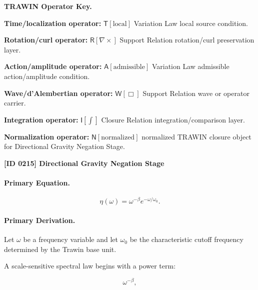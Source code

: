 \par\vspace{0.45\baselineskip}
\noindent\begin{minipage}[t]{\linewidth}
\begingroup
\small
\raggedright
\textbf{TRAWIN Operator Key.}\par
\noindent\textbf{Time/localization operator:} $\mathsf{T}\!\left[\mathrm{local}\right]$ Variation Law local source condition.\par
\noindent\textbf{Rotation/curl operator:} $\mathsf{R}\!\left[\nabla\times\right]$ Support Relation rotation/curl preservation layer.\par
\noindent\textbf{Action/amplitude operator:} $\mathsf{A}\!\left[\mathrm{admissible}\right]$ Variation Law admissible action/amplitude condition.\par
\noindent\textbf{Wave/d'Alembertian operator:} $\mathsf{W}\!\left[\Box\right]$ Support Relation wave or operator carrier.\par
\noindent\textbf{Integration operator:} $\mathsf{I}\!\left[\int\right]$ Closure Relation integration/comparison layer.\par
\noindent\textbf{Normalization operator:} $\mathsf{N}\!\left[\mathrm{normalized}\right]$ normalized TRAWIN closure object for Directional Gravity Negation Stage.\par
\endgroup
\end{minipage}

\clearpage
\noindent\textbf{[ID 0215] Directional Gravity Negation Stage}\par
\vspace{0.35em}
\paragraph{Primary Equation.}
\begin{equation}
\eta(\omega)
=
\omega^{-\beta}
e^{-\omega/\omega_0}.
\end{equation}

\paragraph{Primary Derivation.}
Let $\omega$ be a frequency variable and let $\omega_0$ be the characteristic cutoff frequency determined by the Trawin base unit.

A scale-sensitive spectral law begins with a power term:

\begin{equation}
\omega^{-\beta},
\end{equation}

